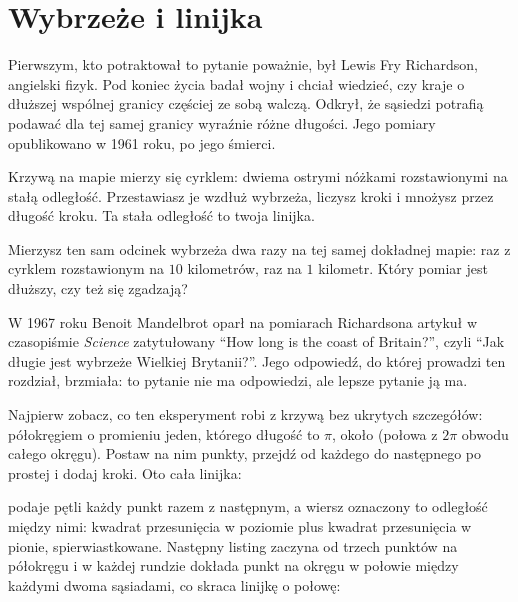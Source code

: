 \section{Wybrzeże i linijka}
\label{sec:ch11-coast}

\noindent
Pierwszym, kto potraktował to pytanie poważnie, był Lewis Fry Richardson,
angielski fizyk. Pod koniec życia badał wojny i chciał wiedzieć, czy kraje o
dłuższej wspólnej granicy częściej ze sobą walczą. Odkrył, że sąsiedzi
potrafią podawać dla tej samej granicy wyraźnie różne długości. Jego pomiary
opublikowano w 1961 roku, po jego śmierci.

Krzywą na mapie mierzy się cyrklem: dwiema ostrymi nóżkami rozstawionymi na
stałą odległość. Przestawiasz je wzdłuż wybrzeża, liczysz kroki i mnożysz
przez długość kroku. Ta stała odległość to twoja linijka.

\begin{think}
Mierzysz ten sam odcinek wybrzeża dwa razy na tej samej dokładnej mapie: raz
z cyrklem rozstawionym na $10$ kilometrów, raz na $1$ kilometr. Który pomiar
jest dłuższy, czy też się zgadzają?
\end{think}
W 1967 roku Benoit Mandelbrot oparł na pomiarach Richardsona artykuł w
czasopiśmie \emph{Science} zatytułowany \enquote{How long is the coast of
Britain?}, czyli \enquote{Jak długie jest wybrzeże Wielkiej Brytanii?}. Jego
odpowiedź, do której prowadzi ten rozdział, brzmiała: to pytanie nie ma
odpowiedzi, ale lepsze pytanie ją ma.

Najpierw zobacz, co ten eksperyment robi z krzywą bez ukrytych szczegółów:
półokręgiem o promieniu jeden, którego długość to $\pi$, około 
(połowa z $2\pi$ obwodu całego okręgu). Postaw na nim punkty, przejdź od
każdego do następnego po prostej i dodaj kroki. Oto cała linijka:


\noindent
{} podaje pętli każdy punkt razem z następnym, a wiersz
oznaczony  to odległość między nimi: kwadrat przesunięcia w
poziomie plus kwadrat przesunięcia w pionie, spierwiastkowane. Następny
listing zaczyna od trzech punktów na półokręgu i w każdej rundzie dokłada
punkt na okręgu w połowie między każdymi dwoma sąsiadami, co skraca linijkę
o połowę:

